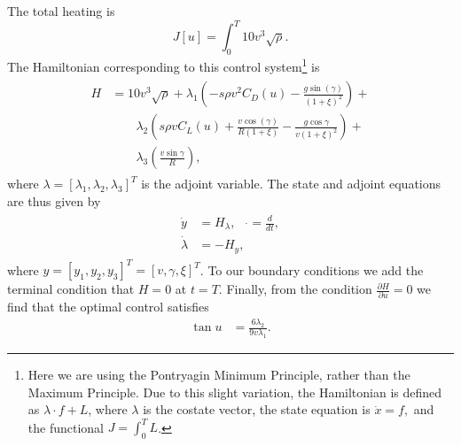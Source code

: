 The total heating is 
\[
J[u] = \int_0^T 10 v^3 \sqrt{\rho}.
\]
The Hamiltonian corresponding to this control system\footnote{Here we are using the Pontryagin Minimum Principle, rather than the Maximum Principle. Due to this slight variation, the Hamiltonian is defined as  $\lambda  \cdot f + L$, where $\lambda$ is the costate vector, the state equation is $\dot{x} = f,$ and the functional $J = \int_0^T L$.} is 
\begin{align}
	\begin{split}
H &=  10v^3 \sqrt{\rho} + \lambda_1 \left ( -s\rho v^2C_D(u) - \frac{g\sin(\gamma)}{(1+\xi)^2} \right) + \\ 
&{ }\quad \quad\lambda_2 \left( s \rho v C_L(u) + \frac{v \cos(\gamma)}{R(1+\xi)} - \frac{g \cos \gamma}{v(1+\xi)^2} \right) + \\
&{ }\quad \quad \lambda_3 \left( \frac{v \sin \gamma}{R} \right),
	\end{split}
\end{align}
where $\lambda = [\lambda_1,\lambda_2,\lambda_3]^T$ is the adjoint variable. 
The state and adjoint equations are thus given by 
\begin{align}
\begin{split}
	\dot{y} &= H_{\lambda},\quad \dot{} = \frac{d}{dt},\\
	\dot{\lambda} &= -H_{y}, \label{eqn:reentry:full_system}
\end{split}
\end{align}
where $y = [y_1,y_2,y_3]^T = [v,\gamma, \xi]^T$.
To our boundary conditions we add the terminal condition that $H = 0$ at $t = T$. 
Finally, from the condition $\frac{\partial H}{\partial u} = 0$ we find that the optimal control satisfies 
\begin{align}
\tan u &= \frac{6\lambda_2}{9v\lambda_1}.
\end{align}


